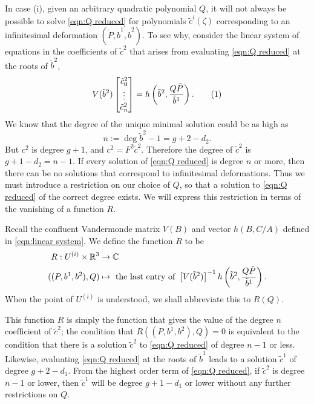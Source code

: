 In case (i), given an arbitrary quadratic polynomial $Q$, it will not always be possible to solve \eqref{eqn:Q reduced} for polynomials $\tilde{c}^i(ζ)$ corresponding to an infinitesimal deformation $(\dot{P},\dot{b}^1,\dot{b}^2)$. To see why, consider the linear system of equations in the coefficients of $\tilde{c}^2$ that arises from evaluating \eqref{eqn:Q reduced} at the roots of $\tilde{b}^2$,
\[
V(\tilde{b}^2)
\begin{bmatrix}
\tilde{c}^2_0 \\ \vdots \\ \tilde{c}^2_n
\end{bmatrix}
=
h\bra{\tilde{b}^2, \frac{Q\tilde{P}}{\tilde{b}^1} }.
\labelthis{eqn:Q reduced linear}
\]
We know that the degree of the unique minimal solution could be as high as
\[
n := \deg \tilde{b}^2 - 1 = g + 2 - d_2.
\]
But $c^2$ is degree $g+1$, and $c^2 = F^2\tilde{c}^2$. Therefore the degree of $\tilde{c}^2$ is $g + 1 - d_2 = n-1$. If every solution of \eqref{eqn:Q reduced} is degree $n$ or more, then there can be no solutions that correspond to infinitesimal deformations. Thus we must introduce a restriction on our choice of $Q$, so that a solution to \eqref{eqn:Q reduced} of the correct degree exists. We will express this restriction in terms of the vanishing of a function $R$.

\begin{defn}
\label{def:def R}
Recall the confluent Vandermonde matrix $V(B)$ and vector $h(B,C/A)$ defined in \eqref{eqn:linear system}. We define the function $R$ to be
\begin{align*}
R : U^{(i)} \times \R^3 &\to \C \\
((P,b^1,b^2), Q) &\mapsto \text{ the last entry of } \left[V( \tilde{b}^2 )\right]^{-1}
h\bra{\tilde{b}^2, \frac{Q\tilde{P}}{\tilde{b}^1} }.
\end{align*}
When the point of $U^{(i)}$ is understood, we shall abbreviate this to $R(Q)$.
\end{defn}

This function $R$ is simply the function that gives the value of the degree $n$ coefficient of $\tilde{c}^2$; the condition that $R((P,b^1,b^2),Q) = 0$ is equivalent to the condition that there is a solution $\tilde{c}^2$ to \eqref{eqn:Q reduced} of degree $n-1$ or less.
Likewise, evaluating \eqref{eqn:Q reduced} at the roots of $\tilde{b}^1$ leads to a solution $\tilde{c}^1$ of degree $g+2 - d_1$. From the highest order term of \eqref{eqn:Q reduced}, if $\tilde{c}^2$ is degree $n-1$ or lower, then $\tilde{c}^1$ will be degree $g + 1 - d_1$ or lower without any further restrictions on $Q$.

